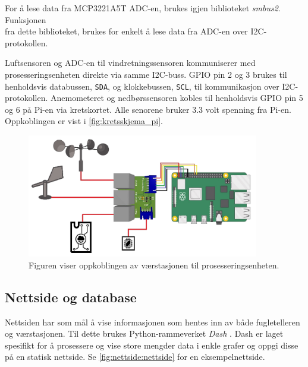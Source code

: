 For å lese data fra MCP3221A5T ADC-en, brukes igjen biblioteket \textit{smbus2}\cite{smbus2}. 
Funksjonen \\  fra dette biblioteket, brukes for enkelt å lese data fra ADC-en over I2C-protokollen. 

Luftsensoren og ADC-en til vindretningssensoren kommuniserer med prosesseringsenheten direkte via samme I2C-buss. 
GPIO pin 2 og 3 brukes til henholdsvis databussen, \texttt{SDA}, og klokkebussen, \texttt{SCL}, til kommunikasjon over I2C-protokollen.
Anemometeret og nedbørssensoren kobles til henholdsvis GPIO pin 5 og 6 på Pi-en via kretskortet. 
Alle senorene bruker 3.3 volt spenning fra Pi-en.
Oppkoblingen er vist i \autoref{fig:kretsskjema_pi}.

\begin{figure}[H]
    \centering
    \includegraphics[width=0.9\textwidth]{implementering/vaer/kretsskjema_pi.png}
    \caption{Figuren viser oppkoblingen av værstasjonen til prosesseringsenheten.}
    \label{fig:kretsskjema_pi}
\end{figure}


\subsection{Nettside og database}\label{sec:impl:nettside}

Nettsiden har som mål å vise informasjonen som hentes inn av både fugletelleren og værstasjonen. 
Til dette brukes Python-rammeverket \textit{Dash} \cite{dash}. 
Dash er laget spesifikt for å prosessere og vise store mengder data i enkle grafer og oppgi disse på en statisk nettside. 
Se \autoref{fig:nettside:nettside}  for en eksempelnettside.


